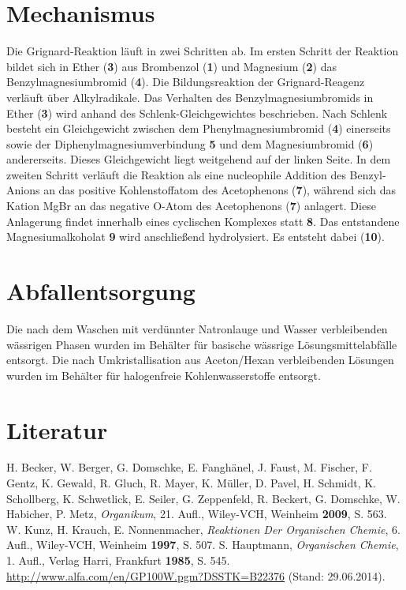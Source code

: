 \documentclass[12pt]{article}
\begin{document}
\begin{onehalfspace}
\begin{experimental}[format=\bfseries,delta=(ppm),list=true,use-equal,pos-number = side]
\begin{minipage}[t][][b]{0.40\textwidth}
\end{minipage}
\end{experimental}

\section{Mechanismus\cite{bio}\cite{sig}}
Die Grignard-Reaktion läuft in zwei Schritten ab. Im ersten Schritt der Reaktion bildet sich in Ether (\textbf{3}) aus Brombenzol (\textbf{1}) und Magnesium (\textbf{2}) das Benzylmagnesiumbromid (\textbf{4}). Die Bildungsreaktion der Grignard-Reagenz verläuft über Alkylradikale. 
Das Verhalten des Benzylmagnesiumbromids in Ether (\textbf{3}) wird anhand des Schlenk-Gleichgewichtes beschrieben. Nach Schlenk besteht ein Gleichgewicht zwischen dem Phenylmagnesiumbromid (\textbf{4}) einerseits sowie der Diphenylmagnesiumverbindung \textbf{5} und dem Magnesiumbromid (\textbf{6}) andererseits. Dieses Gleichgewicht liegt weitgehend auf der linken Seite. In dem zweiten Schritt verläuft die Reaktion als eine nucleophile Addition des Benzyl-Anions an das positive Kohlenstoffatom des Acetophenons (\textbf{7}), während sich das Kation MgBr an das negative O-Atom des Acetophenons (\textbf{7}) anlagert. Diese Anlagerung findet innerhalb eines cyclischen Komplexes statt \textbf{8}. Das entstandene Magnesiumalkoholat \textbf{9} wird anschließend hydrolysiert. Es entsteht dabei  (\textbf{10}).
\section{Abfallentsorgung}
Die nach dem Waschen mit verdünnter Natronlauge und Wasser verbleibenden wässrigen Phasen wurden im Behälter für basische wässrige Lösungsmittelabfälle entsorgt. Die nach Umkristallisation aus Aceton/Hexan verbleibenden Lösungen wurden im Behälter für halogenfreie Kohlenwasserstoffe entsorgt.
\section{Literatur}
\renewcommand{\section}[2]{}%
\begin{thebibliography}{}
H. Becker, W. Berger, G. Domschke, E. Fanghänel, J. Faust, M. Fischer, F. Gentz, K. Gewald, R. Gluch, R. Mayer, K. Müller, D. Pavel, H. Schmidt, K. Schollberg, K. Schwetlick, E. Seiler, G. Zeppenfeld, R. Beckert, G. Domschke, W. Habicher, P. Metz, \textit{Organikum}, 21. Aufl., Wiley-VCH, Weinheim \textbf{2009}, S. 563. 
W. Kunz, H. Krauch, E. Nonnenmacher, \textit{Reaktionen Der Organischen Chemie}, 6. Aufl., Wiley-VCH, Weinheim \textbf{1997}, S. 507.
S. Hauptmann, \textit{Organischen Chemie}, 1. Aufl., Verlag Harri, Frankfurt \textbf{1985}, S. 545.
\url{http://www.alfa.com/en/GP100W.pgm?DSSTK=B22376} (Stand: 29.06.2014).
\end{thebibliography}
\end{onehalfspace}
\end{document}
